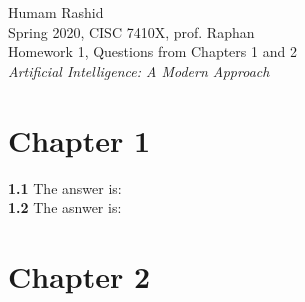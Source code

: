 \documentclass{scrartcl}
\begin{document}
\begin{flushleft}
Humam Rashid\\
Spring 2020, CISC 7410X, prof. Raphan\\
Homework 1, Questions from Chapters 1 and 2\\
\textit{Artificial Intelligence: A Modern Approach}
\end{flushleft}

\section*{Chapter 1}
\textbf{1.1} The answer is:
\\
\textbf{1.2} The asnwer is:

\section*{Chapter 2}
\end{document}
